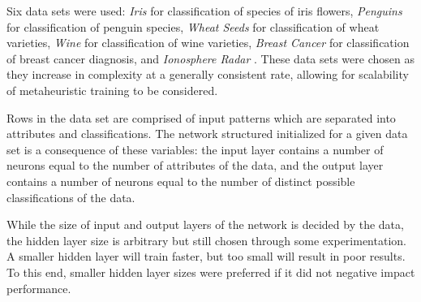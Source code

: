 \documentclass[a4paper,12pt]{article}
\begin{document}
Six data sets were used: \textit{Iris} \cite{data} for classification of species of iris flowers, \textit{Penguins} \cite{penguins} for classification of penguin species, \textit{Wheat Seeds} \cite{data} for classification of wheat varieties, \textit{Wine} \cite{data} for classification of wine varieties, \textit{Breast Cancer} \cite{data} for classification of breast cancer diagnosis, and \textit{Ionosphere Radar} \cite{data}. These data sets were chosen as they increase in complexity at a generally consistent rate, allowing for scalability of metaheuristic training to be considered.

Rows in the data set are comprised of input patterns which are separated into attributes and classifications. The network structured initialized for a given data set is a consequence of these variables: the input layer contains a number of neurons equal to the number of attributes of the data, and the output layer contains a number of neurons equal to the number of distinct possible classifications of the data.

\begin{table}[h!]
\centering
{}
\caption{Data sets used for results collection.}
\label{Tab:data-sets}
\end{table}

While the size of input and output layers of the network is decided by the data, the hidden layer size is arbitrary but still chosen through some experimentation. A smaller hidden layer will train faster, but too small will result in poor results. To this end, smaller hidden layer sizes were preferred if it did not negative impact performance.
\end{document}
